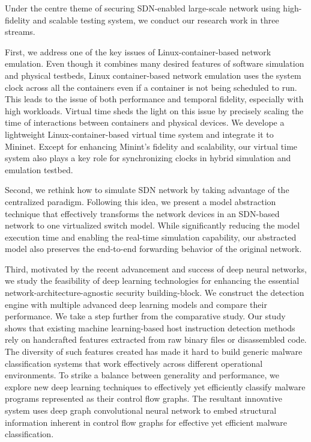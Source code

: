
Under the centre theme of securing SDN-enabled large-scale network using high-fidelity and scalable testing system, we conduct our research work in three streams.

First, we address one of the key issues of Linux-container-based network emulation.
Even though it combines many desired features of software simulation and physical testbeds,
Linux container-based network emulation uses the system clock across all the containers even if a container is not being scheduled to run.
This leads to the issue of both performance and temporal fidelity, especially with high workloads.
Virtual time sheds the light on this issue by precisely scaling the time of interactions between containers and physical devices.
We develope a lightweight Linux-container-based virtual time system and integrate it to Mininet.
Except for enhancing Minint's fidelity and scalability,
our virtual time system also plays a key role for synchronizing clocks in hybrid simulation and emulation testbed.

Second, we rethink how to simulate SDN network by taking advantage of the centralized paradigm.
Following this idea, we present a model abstraction technique that effectively transforms
the network devices in an SDN-based network to one virtualized switch model.
While significantly reducing the model execution time and enabling the real-time simulation capability,
our abstracted model also preserves the end-to-end forwarding behavior of the original network.

Third, motivated by the recent advancement and success of deep neural networks,
we study the feasibility of deep learning technologies for enhancing the essential network-architecture-agnostic security building-block.
We construct the detection engine with multiple advanced deep learning models and compare their performance.
We take a step further from the comparative study.
Our study shows that existing machine learning-based host instruction detection methods rely on handcrafted features extracted from raw binary files or disassembled code.
The diversity of such features created has made it hard to build generic malware classification systems that
work effectively across different operational environments.
To strike a balance between generality and performance,
we explore new deep learning techniques to effectively yet efficiently classify malware programs represented as their control flow graphs.
The resultant innovative system uses deep graph convolutional neural network to
embed structural information inherent in control flow graphs for effective yet efficient malware classification.

